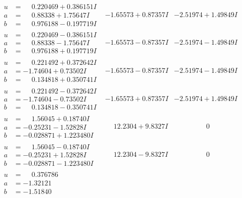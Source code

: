 \documentclass[1p]{elsarticle_modified}
\theoremstyle{definition}
\begin{document}
$$\begin{array}{c|c|c}
\begin{aligned}
u &= \phantom{-}0.220469 + 0.386151 I \\
a &= \phantom{-}0.88338 + 1.75647 I \\
b &= \phantom{-}0.976188 - 0.197719 I\end{aligned}
 & -1.65573 + 0.87357 I & -2.51974 + 1.49849 I \\ \hline\begin{aligned}
u &= \phantom{-}0.220469 - 0.386151 I \\
a &= \phantom{-}0.88338 - 1.75647 I \\
b &= \phantom{-}0.976188 + 0.197719 I\end{aligned}
 & -1.65573 - 0.87357 I & -2.51974 - 1.49849 I \\ \hline\begin{aligned}
u &= \phantom{-}0.221492 + 0.372642 I \\
a &= -1.74604 + 0.73502 I \\
b &= \phantom{-}0.134818 + 0.350741 I\end{aligned}
 & -1.65573 - 0.87357 I & -2.51974 - 1.49849 I \\ \hline\begin{aligned}
u &= \phantom{-}0.221492 - 0.372642 I \\
a &= -1.74604 - 0.73502 I \\
b &= \phantom{-}0.134818 - 0.350741 I\end{aligned}
 & -1.65573 + 0.87357 I & -2.51974 + 1.49849 I \\ \hline\begin{aligned}
u &= \phantom{-}1.56045 + 0.18740 I \\
a &= -0.25231 - 1.52828 I \\
b &= -0.028871 + 1.223480 I\end{aligned}
 & \phantom{-}12.2304 + 9.8327 I & \phantom{-0.000000 } 0 \\ \hline\begin{aligned}
u &= \phantom{-}1.56045 - 0.18740 I \\
a &= -0.25231 + 1.52828 I \\
b &= -0.028871 - 1.223480 I\end{aligned}
 & \phantom{-}12.2304 - 9.8327 I & \phantom{-0.000000 } 0 \\ \hline\begin{aligned}
u &= \phantom{-}0.376786\phantom{ +0.000000I} \\
a &= -1.32121\phantom{ +0.000000I} \\
b &= -1.51840\phantom{ +0.000000I}\end{aligned}

\end{array}$$
\end{document}
